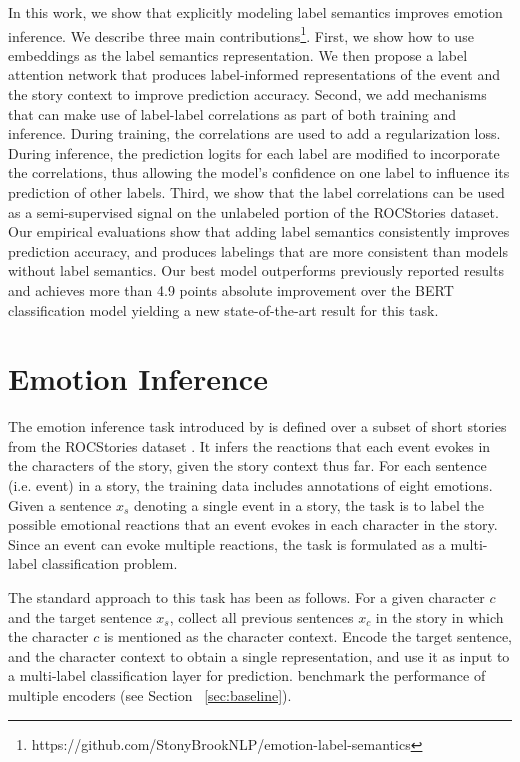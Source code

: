 \documentclass[11pt,a4paper]{article}
\begin{document}
In this work, we show that explicitly modeling label semantics improves emotion inference. We describe three main contributions\footnote{https://github.com/StonyBrookNLP/emotion-label-semantics}. First, we show how to use embeddings as the label semantics representation. We then propose a label attention network that produces label-informed representations of the event and the story context to improve prediction accuracy. Second, we add mechanisms that can make use of label-label correlations as part of both training and inference. During training, the correlations are used to add a regularization loss. During inference, the prediction logits for each label are modified to incorporate the correlations, thus allowing the model's confidence on one label to influence its prediction of other labels. Third, we show that the label correlations can be used as a semi-supervised signal on the unlabeled portion of the ROCStories dataset.\\
Our empirical evaluations show that adding label semantics consistently improves prediction accuracy, and produces labelings that are more consistent than models without label semantics. Our best model outperforms previously reported results and achieves more than 4.9 points absolute improvement over the BERT classification model yielding a new state-of-the-art result for this task. \section{Emotion Inference}
The emotion inference task introduced by \citet{rashkin2018modeling} is defined over a subset of short stories from the ROCStories dataset \cite{mostafazadeh2016corpus}. It infers the reactions that each event evokes in the characters of the story, given the story context thus far. For each sentence (i.e. event) in a story, the training data includes annotations of eight emotions. Given a sentence $x_s$ denoting a single event in a story, the task is to label the possible emotional reactions that an event evokes in each character in the story. Since an event can evoke multiple reactions, the task is formulated as a multi-label classification problem.

The standard approach to this task has been as follows. For a given character $c$ and the target sentence $x_s$, collect all previous sentences $x_c$ in the story in which the character $c$ is mentioned as the character context. Encode the target sentence, and the character context to obtain a single representation, and use it as input to a multi-label classification layer for prediction. \citet{rashkin2018modeling} benchmark the performance of multiple encoders (see Section~ \ref{sec:baseline}).
\end{document}
